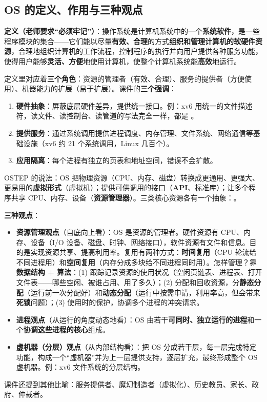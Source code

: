 \subsection{OS 的定义、作用与三种观点}

\textbf{定义（老师要求“必须牢记”）}：操作系统是计算机系统中的一个\textbf{系统软件}，是一些程序模块的集合——它们能以尽量\textbf{有效、合理}的方式\textbf{组织和管理计算机的软硬件资源}，合理地组织计算机的工作流程，控制程序的执行并向用户提供各种服务功能，使得用户能够\textbf{灵活、方便}地使用计算机，使整个计算机系统能\textbf{高效}地运行。

定义里对应着\textbf{三个角色}：资源的管理者（有效、合理）、服务的提供者（方便使用）、机器能力的扩展（易于扩展）。课件的\textbf{三个强调}：
\begin{enumerate}
    \item \textbf{硬件抽象}：屏蔽底层硬件差异，提供统一接口。例：xv6 用统一的文件描述符，读文件、读控制台、读管道的写法完全一样，都是 。
    \item \textbf{提供服务}：通过系统调用提供进程调度、内存管理、文件系统、网络通信等基础设施（xv6 约 21 个系统调用，Linux 几百个）。
    \item \textbf{应用隔离}：每个进程有独立的页表和地址空间，错误不会扩散。
\end{enumerate}
OSTEP 的说法：OS 把物理资源（CPU、内存、磁盘）转换成更通用、更强大、更易用的\textbf{虚拟形式}（虚拟机）；提供可供调用的接口（\textbf{API}、标准库）；让多个程序共享 CPU、内存、设备（\textbf{资源管理器}）。三类核心资源各有一个抽象：。

\textbf{三种观点}：
\begin{itemize}
    \item \textbf{资源管理观点}（自底向上看）：OS 是资源的管理者。硬件资源有 CPU、内存、设备（I/O 设备、磁盘、时钟、网络接口），软件资源有文件和信息。目的是实现资源共享、提高利用率。复用有两种方式：\textbf{时间复用}（CPU 轮流给不同进程用）和\textbf{空间复用}（内存分成多块给不同进程同时用）。怎样管理？靠\textbf{数据结构 + 算法}：(1) 跟踪记录资源的使用状况（空闲页链表、进程表、打开文件表——哪些空闲、被谁占用、用了多久）；(2) 分配和回收资源，分\textbf{静态分配}（运行前一次分配好）和\textbf{动态分配}（运行中按需申请，利用率高，但会带来\textbf{死锁}问题）；(3) 使用时的保护，协调多个进程的冲突请求。
    \item \textbf{进程观点}（从运行的角度动态地看）：OS 由若干\textbf{可同时、独立运行的进程}和一个\textbf{协调这些进程的核心}组成。
    \item \textbf{虚机器（分层）观点}（从内部结构看）：把 OS 分成若干层，每一层完成特定功能，构成一个“虚机器”并为上一层提供支持，逐层扩充，最终形成整个 OS 虚机器。例：xv6 文件系统的分层结构。
\end{itemize}
课件还提到其他比喻：服务提供者、魔幻制造者（虚拟化）、历史教员、家长、政府、仲裁者。


